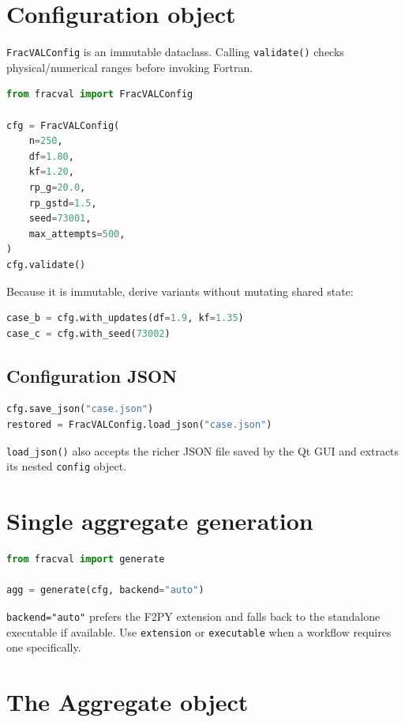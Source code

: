 \documentclass[11pt,oneside]{report}
\newcommand{\code}[1]{\texttt{#1}}
\begin{document}
\section{Configuration object}

\code{FracVALConfig} is an immutable dataclass. Calling \code{validate()} checks
physical/numerical ranges before invoking Fortran.

\begin{lstlisting}[language=Python]
from fracval import FracVALConfig

cfg = FracVALConfig(
    n=250,
    df=1.80,
    kf=1.20,
    rp_g=20.0,
    rp_gstd=1.5,
    seed=73001,
    max_attempts=500,
)
cfg.validate()
\end{lstlisting}

Because it is immutable, derive variants without mutating shared state:

\begin{lstlisting}[language=Python]
case_b = cfg.with_updates(df=1.9, kf=1.35)
case_c = cfg.with_seed(73002)
\end{lstlisting}

\subsection{Configuration JSON}

\begin{lstlisting}[language=Python]
cfg.save_json("case.json")
restored = FracVALConfig.load_json("case.json")
\end{lstlisting}

\code{load\_json()} also accepts the richer JSON file saved by the Qt GUI and
extracts its nested \code{config} object.

\section{Single aggregate generation}

\begin{lstlisting}[language=Python]
from fracval import generate

agg = generate(cfg, backend="auto")
\end{lstlisting}

\code{backend="auto"} prefers the F2PY extension and falls back to the
standalone executable if available. Use \code{extension} or \code{executable}
when a workflow requires one specifically.

\section{The Aggregate object}\label{sec:derived}
\end{document}
